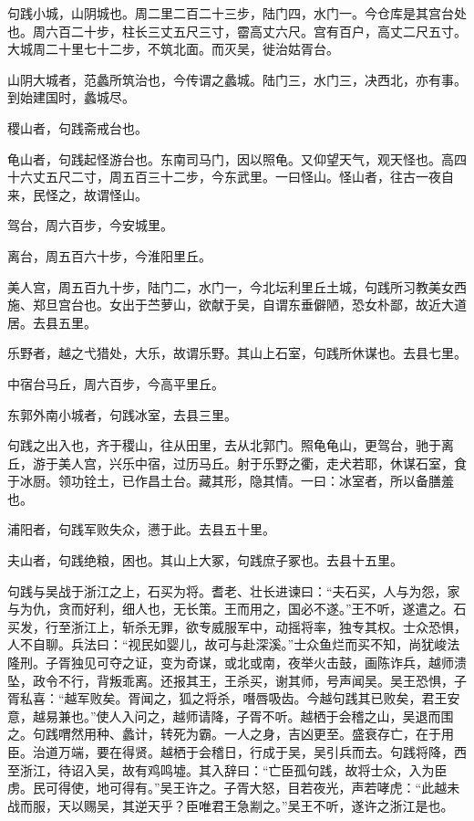 \documentclass[12pt,UTF8]{ctexbook}
\begin{document}
句践小城，山阴城也。周二里二百二十三步，陆门四，水门一。今仓库是其宫台处也。周六百二十步，柱长三丈五尺三寸，霤高丈六尺。宫有百户，高丈二尺五寸。大城周二十里七十二步，不筑北面。而灭吴，徙治姑胥台。

山阴大城者，范蠡所筑治也，今传谓之蠡城。陆门三，水门三，决西北，亦有事。到始建国时，蠡城尽。

稷山者，句践斋戒台也。

龟山者，句践起怪游台也。东南司马门，因以照龟。又仰望天气，观天怪也。高四十六丈五尺二寸，周五百三十二步，今东武里。一曰怪山。怪山者，往古一夜自来，民怪之，故谓怪山。

驾台，周六百步，今安城里。

离台，周五百六十步，今淮阳里丘。

美人宫，周五百九十步，陆门二，水门一，今北坛利里丘土城，句践所习教美女西施、郑旦宫台也。女出于苎萝山，欲献于吴，自谓东垂僻陋，恐女朴鄙，故近大道居。去县五里。

乐野者，越之弋猎处，大乐，故谓乐野。其山上石室，句践所休谋也。去县七里。

中宿台马丘，周六百步，今高平里丘。

东郭外南小城者，句践冰室，去县三里。

句践之出入也，齐于稷山，往从田里，去从北郭门。照龟龟山，更驾台，驰于离丘，游于美人宫，兴乐中宿，过历马丘。射于乐野之衢，走犬若耶，休谋石室，食于冰厨。领功铨土，已作昌土台。藏其形，隐其情。一曰：冰室者，所以备膳羞也。

浦阳者，句践军败失众，懑于此。去县五十里。

夫山者，句践绝粮，困也。其山上大冢，句践庶子冢也。去县十五里。

句践与吴战于浙江之上，石买为将。耆老、壮长进谏曰：“夫石买，人与为怨，家与为仇，贪而好利，细人也，无长策。王而用之，国必不遂。”王不听，遂遣之。石买发，行至浙江上，斩杀无罪，欲专威服军中，动摇将率，独专其权。士众恐惧，人不自聊。兵法曰：“视民如婴儿，故可与赴深溪。”士众鱼烂而买不知，尚犹峻法隆刑。子胥独见可夺之证，变为奇谋，或北或南，夜举火击鼓，画陈诈兵，越师溃坠，政令不行，背叛乖离。还报其王，王杀买，谢其师，号声闻吴。吴王恐惧，子胥私喜：“越军败矣。胥闻之，狐之将杀，噆唇吸齿。今越句践其已败矣，君王安意，越易兼也。”使人入问之，越师请降，子胥不听。越栖于会稽之山，吴退而围之。句践喟然用种、蠡计，转死为霸。一人之身，吉凶更至。盛衰存亡，在于用臣。治道万端，要在得贤。越栖于会稽日，行成于吴，吴引兵而去。句践将降，西至浙江，待诏入吴，故有鸡鸣墟。其入辞曰：“亡臣孤句践，故将士众，入为臣虏。民可得使，地可得有。”吴王许之。子胥大怒，目若夜光，声若哮虎：“此越未战而服，天以赐吴，其逆天乎？臣唯君王急剬之。”吴王不听，遂许之浙江是也。
\end{document}
